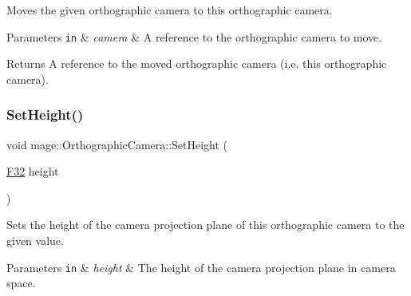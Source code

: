 Moves the given orthographic camera to this orthographic camera.


\begin{DoxyParams}[1]{Parameters}
\mbox{\tt in}  & {\em camera} & A reference to the orthographic camera to move. \\
\hline
\end{DoxyParams}
\begin{DoxyReturn}{Returns}
A reference to the moved orthographic camera (i.\+e. this orthographic camera). 
\end{DoxyReturn}
\hypertarget{classmage_1_1_orthographic_camera_a29e910ff54a53ee149798cbf062e9416}{}\label{classmage_1_1_orthographic_camera_a29e910ff54a53ee149798cbf062e9416} 
\subsubsection{\texorpdfstring{Set\+Height()}{SetHeight()}}
{\footnotesize\ttfamily void mage\+::\+Orthographic\+Camera\+::\+Set\+Height (\begin{DoxyParamCaption}\item[{\hyperlink{namespacemage_aa97e833b45f06d60a0a9c4fc22ae02c0}{F32}}]{height }\end{DoxyParamCaption})\hspace{0.3cm}{\ttfamily [noexcept]}}

Sets the height of the camera projection plane of this orthographic camera to the given value.


\begin{DoxyParams}[1]{Parameters}
\mbox{\tt in}  & {\em height} & The height of the camera projection plane in camera space. \\
\hline
\end{DoxyParams}
\hypertarget{classmage_1_1_orthographic_camera_a8b86c23bb9da55d9e55a4da4a82b9d72}{}\label{classmage_1_1_orthographic_camera_a8b86c23bb9da55d9e55a4da4a82b9d72} 
